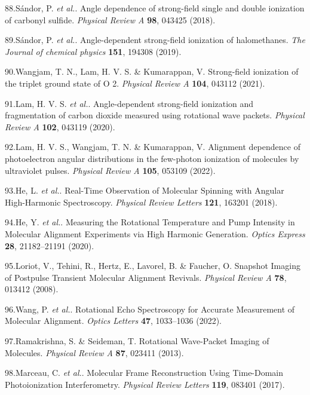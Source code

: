 \documentclass[10pt]{article}
\begin{document}
\label{csl:88}88.S{\'a}ndor, P. \textit{et al.}. {Angle dependence of strong-field single and double ionization of carbonyl sulfide}. \textit{Physical Review A} \textbf{98}, 043425 (2018).

\label{csl:89}89.S{\'a}ndor, P. \textit{et al.}. {Angle-dependent strong-field ionization of halomethanes}. \textit{The Journal of chemical physics} \textbf{151}, 194308 (2019).

\label{csl:90}90.Wangjam, T. N., Lam, H. V. S. \& Kumarappan, V. {Strong-field ionization of the triplet ground state of O 2}. \textit{Physical Review A} \textbf{104}, 043112 (2021).

\label{csl:91}91.Lam, H. V. S. \textit{et al.}. {Angle-dependent strong-field ionization and fragmentation of carbon dioxide measured using rotational wave packets}. \textit{Physical Review A} \textbf{102}, 043119 (2020).

\label{csl:92}92.Lam, H. V. S., Wangjam, T. N. \& Kumarappan, V. {Alignment dependence of photoelectron angular distributions in the few-photon ionization of molecules by ultraviolet pulses}. \textit{Physical Review A} \textbf{105}, 053109 (2022).

\label{csl:93}93.He, L. \textit{et al.}. {Real-{{Time Observation}} of {{Molecular Spinning}} with {{Angular High-Harmonic Spectroscopy}}}. \textit{Physical Review Letters} \textbf{121}, 163201 (2018).

\label{csl:94}94.He, Y. \textit{et al.}. {Measuring the Rotational Temperature and Pump Intensity in Molecular Alignment Experiments via High Harmonic Generation}. \textit{Optics Express} \textbf{28}, 21182–21191 (2020).

\label{csl:95}95.Loriot, V., Tehini, R., Hertz, E., Lavorel, B. \& Faucher, O. {Snapshot Imaging of Postpulse Transient Molecular Alignment Revivals}. \textit{Physical Review A} \textbf{78}, 013412 (2008).

\label{csl:96}96.Wang, P. \textit{et al.}. {Rotational Echo Spectroscopy for Accurate Measurement of Molecular Alignment}. \textit{Optics Letters} \textbf{47}, 1033–1036 (2022).

\label{csl:97}97.Ramakrishna, S. \& Seideman, T. {Rotational Wave-Packet Imaging of Molecules}. \textit{Physical Review A} \textbf{87}, 023411 (2013).

\label{csl:98}98.Marceau, C. \textit{et al.}. {Molecular {{Frame Reconstruction Using Time-Domain Photoionization Interferometry}}}. \textit{Physical Review Letters} \textbf{119}, 083401 (2017).
\end{document}

